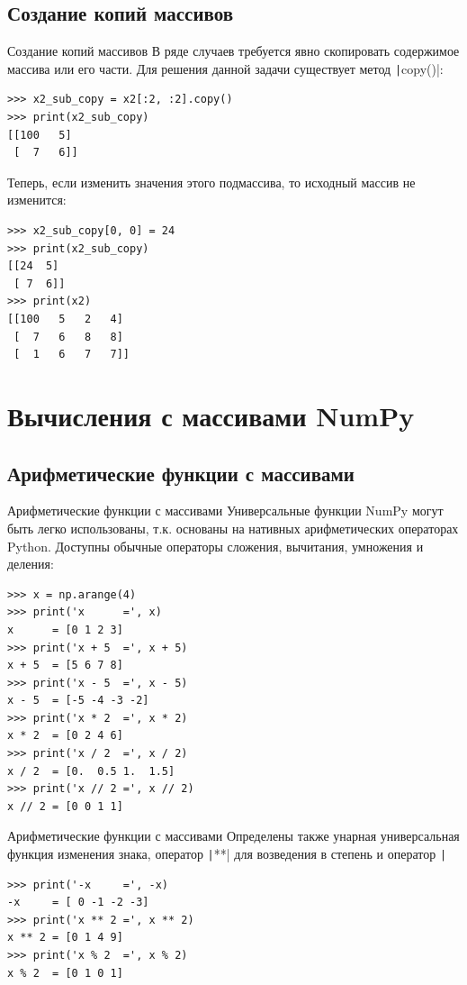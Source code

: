 \documentclass[aspectratio=169, mathserif]{beamer}	%
\begin{document}
\subsection{Создание копий массивов}
\begin{frame}[fragile]{Создание копий массивов}
\scriptsize
В ряде случаев требуется явно скопировать содержимое массива или его части. Для решения данной задачи существует метод \texttt|copy()|:

\begin{verbatim}
>>> x2_sub_copy = x2[:2, :2].copy()
>>> print(x2_sub_copy)
[[100   5]
 [  7   6]]
\end{verbatim}

Теперь, если изменить значения этого подмассива, то исходный массив не изменится:

\begin{verbatim}
>>> x2_sub_copy[0, 0] = 24
>>> print(x2_sub_copy)
[[24  5]
 [ 7  6]]
>>> print(x2)
[[100   5   2   4]
 [  7   6   8   8]
 [  1   6   7   7]]
\end{verbatim}
\vfill
\end{frame}

\section{Вычисления с массивами NumPy}
\sectionframe

\subsection{Арифметические функции с массивами}
\begin{frame}[fragile]{Арифметические функции с массивами}
\scriptsize
Универсальные функции NumPy могут быть легко использованы, т.к. основаны на нативных арифметических операторах Python. Доступны обычные операторы сложения, вычитания, умножения и деления:

\begin{verbatim}
>>> x = np.arange(4)
>>> print('x      =', x)
x      = [0 1 2 3]
>>> print('x + 5  =', x + 5)
x + 5  = [5 6 7 8]   
>>> print('x - 5  =', x - 5)
x - 5  = [-5 -4 -3 -2]   
>>> print('x * 2  =', x * 2)
x * 2  = [0 2 4 6]   
>>> print('x / 2  =', x / 2)
x / 2  = [0.  0.5 1.  1.5]   
>>> print('x // 2 =', x // 2)
x // 2 = [0 0 1 1]
\end{verbatim}
\vfill
\end{frame}

\begin{frame}[fragile]{Арифметические функции с массивами}
\scriptsize
Определены также унарная универсальная функция изменения знака, оператор \texttt|**| для возведения в степень и оператор \texttt|%
\begin{verbatim}
>>> print('-x     =', -x)
-x     = [ 0 -1 -2 -3]
>>> print('x ** 2 =', x ** 2)
x ** 2 = [0 1 4 9]
>>> print('x % 2  =', x % 2)
x % 2  = [0 1 0 1]
\end{verbatim}
\vfill
\end{frame}
\end{document}

